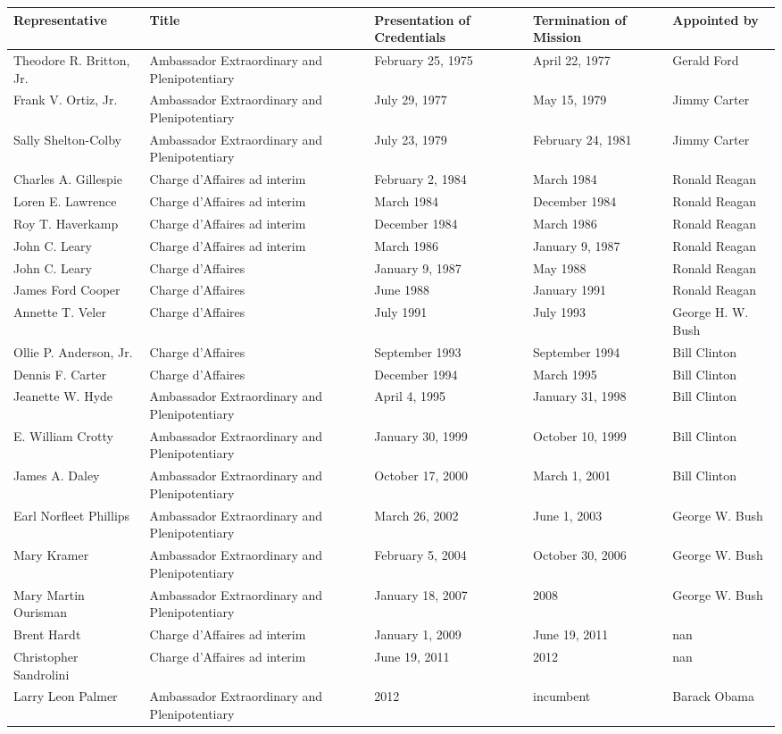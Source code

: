 \documentclass{article}
\begin{document}
\begin{tabular}{lllll}
\toprule
Representative & Title & Presentation of Credentials & Termination of Mission & Appointed by \\
\midrule
Theodore R. Britton, Jr. & Ambassador Extraordinary and Plenipotentiary & February 25, 1975 & April 22, 1977 & Gerald Ford \\
Frank V. Ortiz, Jr. & Ambassador Extraordinary and Plenipotentiary & July 29, 1977 & May 15, 1979 & Jimmy Carter \\
Sally Shelton-Colby & Ambassador Extraordinary and Plenipotentiary & July 23, 1979 & February 24, 1981 & Jimmy Carter \\
Charles A. Gillespie & Charge d'Affaires ad interim & February 2, 1984 & March 1984 & Ronald Reagan \\
Loren E. Lawrence & Charge d'Affaires ad interim & March 1984 & December 1984 & Ronald Reagan \\
Roy T. Haverkamp & Charge d'Affaires ad interim & December 1984 & March 1986 & Ronald Reagan \\
John C. Leary & Charge d'Affaires ad interim & March 1986 & January 9, 1987 & Ronald Reagan \\
John C. Leary & Charge d'Affaires & January 9, 1987 & May 1988 & Ronald Reagan \\
James Ford Cooper & Charge d'Affaires & June 1988 & January 1991 & Ronald Reagan \\
Annette T. Veler & Charge d'Affaires & July 1991 & July 1993 & George H. W. Bush \\
Ollie P. Anderson, Jr. & Charge d'Affaires & September 1993 & September 1994 & Bill Clinton \\
Dennis F. Carter & Charge d'Affaires & December 1994 & March 1995 & Bill Clinton \\
Jeanette W. Hyde & Ambassador Extraordinary and Plenipotentiary & April 4, 1995 & January 31, 1998 & Bill Clinton \\
E. William Crotty & Ambassador Extraordinary and Plenipotentiary & January 30, 1999 & October 10, 1999 & Bill Clinton \\
James A. Daley & Ambassador Extraordinary and Plenipotentiary & October 17, 2000 & March 1, 2001 & Bill Clinton \\
Earl Norfleet Phillips & Ambassador Extraordinary and Plenipotentiary & March 26, 2002 & June 1, 2003 & George W. Bush \\
Mary Kramer & Ambassador Extraordinary and Plenipotentiary & February 5, 2004 & October 30, 2006 & George W. Bush \\
Mary Martin Ourisman & Ambassador Extraordinary and Plenipotentiary & January 18, 2007 & 2008 & George W. Bush \\
Brent Hardt & Charge d'Affaires ad interim & January 1, 2009 & June 19, 2011 & nan \\
Christopher Sandrolini & Charge d'Affaires ad interim & June 19, 2011 & 2012 & nan \\
Larry Leon Palmer & Ambassador Extraordinary and Plenipotentiary & 2012 & incumbent & Barack Obama \\
\bottomrule
\end{tabular}
\end{document}
